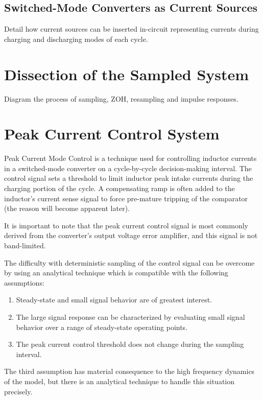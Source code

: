 \documentclass[conference]{IEEEtran}
\begin{document}
\subsection{Switched-Mode Converters as Current Sources}

Detail how current sources can be inserted in-circuit representing currents during charging and discharging modes of each cycle.


\section{Dissection of the Sampled System}
Diagram the process of sampling, ZOH, resampling and impulse responses.



\section{Peak Current Control System}

Peak Current Mode Control is a technique used for controlling inductor currents in a switched-mode converter on a cycle-by-cycle decision-making interval. The control signal sets a threshold to limit inductor peak intake currents during the charging portion of the cycle. A compensating ramp is often added to the inductor's current sense signal to force pre-mature tripping of the comparator (the reason will become apparent later).

It is important to note that the peak current control signal is most commonly derived from the converter’s output voltage error amplifier, and this signal is not band-limited.

The difficulty with deterministic sampling of the control signal can be overcome by using an analytical technique which is compatible with the following assumptions:
\begin{enumerate}
	\item Steady-state and small signal behavior are of greatest interest.
	\item The large signal response can be characterized by evaluating small signal behavior over a range of steady-state operating points. 
	\item The peak current control threshold does not change during the sampling interval.
\end{enumerate}

The third assumption has material consequence to the high frequency dynamics of the model, but there is an analytical technique to handle this situation precisely.
\end{document}
